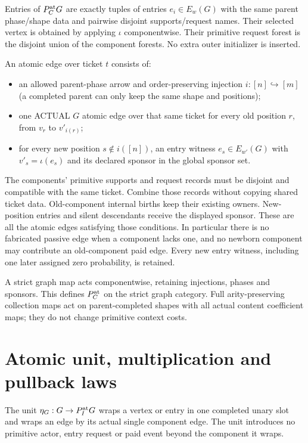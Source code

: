 \documentclass[11pt]{article}
\begin{document}
Entries of $P_C^{\rm at}G$ are exactly tuples of entries $e_i\in E_w(G)$ with the same parent phase/shape data and pairwise disjoint supports/request names. Their selected vertex is obtained by applying $\iota$ componentwise. Their primitive request forest is the disjoint union of the component forests. No extra outer initializer is inserted.

An atomic edge over ticket $t$ consists of:
\begin{itemize}
\item an allowed parent-phase arrow and order-preserving injection $i:[n]\hookrightarrow[m]$ (a completed parent can only keep the same shape and positions);
\item one ACTUAL $G$ atomic edge over that same ticket for every old position $r$, from $v_r$ to $v'_{i(r)}$;
\item for every new position $s\notin i([n])$, an entry witness $e_s\in E_{w'}(G)$ with $v'_s=\iota(e_s)$ and its declared sponsor in the global sponsor set.
\end{itemize}
The components' primitive supports and request records must be disjoint and compatible with the same ticket. Combine those records without copying shared ticket data. Old-component internal births keep their existing owners. New-position entries and silent descendants receive the displayed sponsor. These are all the atomic edges satisfying those conditions. In particular there is no fabricated passive edge when a component lacks one, and no newborn component may contribute an old-component paid edge. Every new entry witness, including one later assigned zero probability, is retained.

A strict graph map acts componentwise, retaining injections, phases and sponsors. This defines $P_C^{\rm at}$ on the strict graph category. Full arity-preserving collection maps act on parent-completed shapes with all actual content coefficient maps; they do not change primitive context costs.

\section{Atomic unit, multiplication and pullback laws}
The unit $\eta_G:G\to P_I^{\rm at}G$ wraps a vertex or entry in one completed unary slot and wraps an edge by its actual single component edge. The unit introduces no primitive actor, entry request or paid event beyond the component it wraps.
\end{document}
